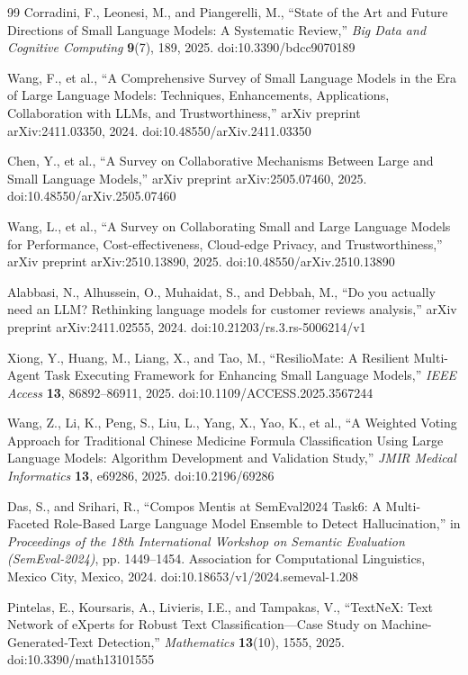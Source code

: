 \begin{thebibliography}{99}
Corradini, F., Leonesi, M., and Piangerelli, M., ``State of the Art and Future Directions of Small Language Models: A Systematic Review,'' \textit{Big Data and Cognitive Computing} \textbf{9}(7), 189, 2025. doi:10.3390/bdcc9070189

Wang, F., et al., ``A Comprehensive Survey of Small Language Models in the Era of Large Language Models: Techniques, Enhancements, Applications, Collaboration with LLMs, and Trustworthiness,'' arXiv preprint arXiv:2411.03350, 2024. doi:10.48550/arXiv.2411.03350

Chen, Y., et al., ``A Survey on Collaborative Mechanisms Between Large and Small Language Models,'' arXiv preprint arXiv:2505.07460, 2025. doi:10.48550/arXiv.2505.07460

Wang, L., et al., ``A Survey on Collaborating Small and Large Language Models for Performance, Cost-effectiveness, Cloud-edge Privacy, and Trustworthiness,'' arXiv preprint arXiv:2510.13890, 2025. doi:10.48550/arXiv.2510.13890

Alabbasi, N., Alhussein, O., Muhaidat, S., and Debbah, M., ``Do you actually need an LLM? Rethinking language models for customer reviews analysis,'' arXiv preprint arXiv:2411.02555, 2024. doi:10.21203/rs.3.rs-5006214/v1

Xiong, Y., Huang, M., Liang, X., and Tao, M., ``ResilioMate: A Resilient Multi-Agent Task Executing Framework for Enhancing Small Language Models,'' \textit{IEEE Access} \textbf{13}, 86892--86911, 2025. doi:10.1109/ACCESS.2025.3567244

Wang, Z., Li, K., Peng, S., Liu, L., Yang, X., Yao, K., et al., ``A Weighted Voting Approach for Traditional Chinese Medicine Formula Classification Using Large Language Models: Algorithm Development and Validation Study,'' \textit{JMIR Medical Informatics} \textbf{13}, e69286, 2025. doi:10.2196/69286

Das, S., and Srihari, R., ``Compos Mentis at SemEval2024 Task6: A Multi-Faceted Role-Based Large Language Model Ensemble to Detect Hallucination,'' in \textit{Proceedings of the 18th International Workshop on Semantic Evaluation (SemEval-2024)}, pp. 1449--1454. Association for Computational Linguistics, Mexico City, Mexico, 2024. doi:10.18653/v1/2024.semeval-1.208

Pintelas, E., Koursaris, A., Livieris, I.E., and Tampakas, V., ``TextNeX: Text Network of eXperts for Robust Text Classification---Case Study on Machine-Generated-Text Detection,'' \textit{Mathematics} \textbf{13}(10), 1555, 2025. doi:10.3390/math13101555


\end{thebibliography}
